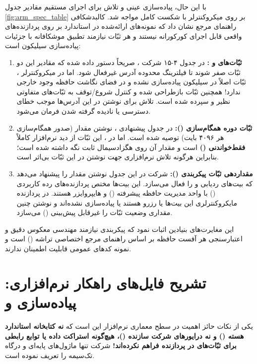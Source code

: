 با این حال، پیاده‌سازی عینی و تلاش برای اجرای مستقیم مقادیر جدول \ref{fig:arm_spec_table} بر روی میکروکنترلر  با شکست کامل مواجه شد. کالبدشکافی راهنمای مرجع  نشان داد که نمونه‌های ارائه‌شده در استاندارد  بر روی پردازنده‌های واقعی قابل اجرای کورکورانه نیستند و هر ثبّات نیازمند تطبیق موشکافانه با جزئیات پیاده‌سازی سیلیکون است:
\begin{enumerate}
    \item \textbf{ثبّات‌های  و :} در جدول ۴-۱۵ شرکت ، صریحاً دستور داده شده که مقادیر این دو ثبّات صفر شوند تا فیلترینگ محدوده آدرس غیرفعال شود. اما در میکروکنترلر ، ثبّات  اصلاً در سیلیکون پیاده‌سازی نشده و در فضای نگاشت حافظه وجود خارجی ندارد! همچنین ثبّات  بازطراحی شده و کنترل شروع/توقف به ثبّات‌های متفاوتی نظیر  و  سپرده شده است. تلاش برای نوشتن در این آدرس‌ها موجب خطای دسترسی یا نادیده گرفته شدن فرمان می‌شود.
    \item \textbf{ثبّات دوره همگام‌سازی ():} در جدول پیشنهادی ، نوشتن مقدار  (صدور همگام‌سازی هر ۴۰۹۶ بایت) توصیه شده است. اما در ، این ثبّات از دید نرم‌افزار کاملاً \textbf{فقط‌خواندنی ()} است و مقدار آن روی هگزادسیمال  ثابت نگه داشته شده است؛ بنابراین هرگونه تلاش نرم‌افزاری جهت نوشتن در این ثبّات بی‌اثر است.
    \item \textbf{مقداردهی ثبّات پیکربندی ():} شرکت  در این جدول نوشتن مقدار  را پیشنهاد می‌دهد که بیت‌های ردیابی  و  را فعال می‌سازد. این بیت‌ها مختص پردازنده‌های رده کاربردی () با واحد مدیریت حافظه پیشرفته () و هایپروایزر هستند. در پردازنده مایکروکنترلری  این بیت‌ها یا رزرو هستند یا پیاده‌سازی نشده‌اند و نوشتن چنین مقداری وضعیت ثبّات را غیرقابل پیش‌بینی () می‌سازد.
\end{enumerate}

این مغایرت‌های بنیادین اثبات نمود که پیکربندی  نیازمند مهندسی معکوس دقیق و اعتبارسنجی هر آفست حافظه بر اساس راهنمای مرجع اختصاصی تراشه () است و نمونه کدهای عمومی قابلیت اطمینان ندارند.

\section{تشریح فایل‌های راهکار نرم‌افزاری: پیاده‌سازی  و }
\label{sec:firmware_implementation}
یکی از نکات حائز اهمیت در سطح معماری نرم‌افزار این است که \textbf{نه کتابخانه استاندارد هسته  () و نه درایورهای شرکت سازنده ()، هیچ‌گونه استراکت داده یا توابع رابطی برای ثبّات‌های  در پردازنده  فراهم نکرده‌اند!} شرکت  تنها ماژول‌های پایه‌ای  و درگاه تک‌سیمه  را تعریف نموده است.

